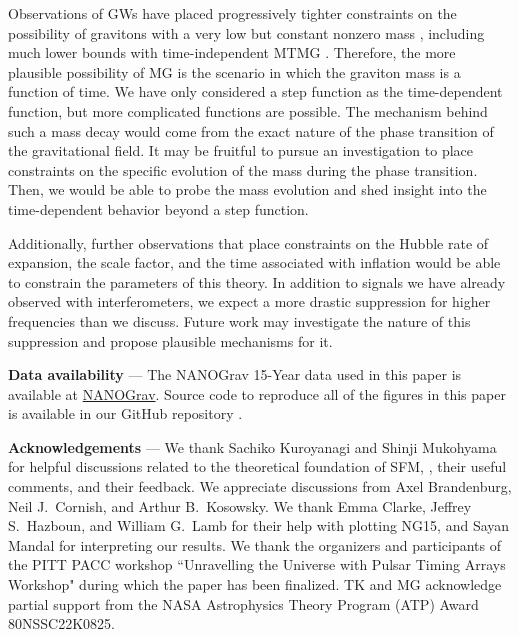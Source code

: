 \documentclass[prd,twocolumn,aps,psfig,nofootinbib,nobibnotes,superscriptaddress,preprintnumbers,times]{revtex4-2}
\begin{document}
Observations of GWs have placed progressively tighter constraints on the possibility of gravitons with a very low but constant nonzero mass \cite{Bernardo:2023mxc, Wu:2023rib, Wang:2023div, deRham:2016nuf}, including much lower bounds with time-independent MTMG \cite{DeFelice:2021trp, DeFelice:2023bwq}. Therefore, the more plausible possibility of MG is the scenario in which the graviton mass is a function of time. We have only considered a step function as the time-dependent function, but more complicated functions are possible. The mechanism behind such a mass decay would come from the exact nature of the phase transition of the gravitational field. It may be fruitful to pursue an investigation to place constraints on the specific evolution of the mass during the phase transition. Then, we would be able to probe the mass evolution and shed insight into the time-dependent behavior beyond a step function. 

Additionally, further observations that place constraints on the Hubble rate of expansion, the scale factor, and the time associated with inflation would be able to constrain the parameters of this theory. In addition to signals we have already observed with interferometers, we expect a more drastic suppression for higher frequencies than we discuss. Future work may investigate the nature of this suppression and propose plausible mechanisms for it.

\vspace{2mm}
{\bf Data availability} --- The NANOGrav 15-Year data used in this paper is available at \href{https://nanograv.org/science/data}{NANOGrav}. Source code to reproduce all of the figures in this paper is available in our GitHub repository \cite{GH}. 

\vspace{2mm}
{\bf Acknowledgements} --- We thank Sachiko Kuroyanagi and Shinji Mukohyama for helpful discussions related to the theoretical foundation of SFM, \cite{Fujita:2018ehq}, their useful comments, and their feedback. We appreciate discussions from Axel Brandenburg, Neil J.\ Cornish, and Arthur B.\ Kosowsky. We thank Emma Clarke, Jeffrey S.\ Hazboun, and William G.\ Lamb for their help with plotting NG15, and Sayan Mandal for interpreting our results. We thank the organizers and participants of the PITT PACC workshop ``Unravelling the Universe with Pulsar Timing Arrays Workshop" during which the paper has been finalized. TK and MG acknowledge partial support from the NASA Astrophysics Theory Program (ATP) Award 80NSSC22K0825.




\clearpage
\end{document}

